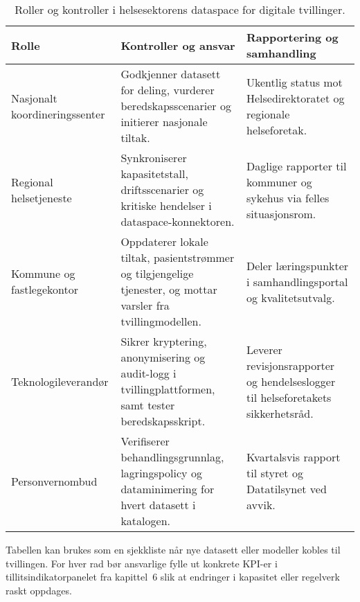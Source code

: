 \begin{table}[ht]
    \centering
    \caption{Roller og kontroller i helsesektorens dataspace for digitale tvillinger.}
    \label{tab:kap03-helse-dataspace}
    \begin{tabular}{p{}p{}p{}}
        \toprule
        \textbf{Rolle} & \textbf{Kontroller og ansvar} & \textbf{Rapportering og samhandling} \\
        \midrule
        Nasjonalt koordineringssenter & Godkjenner datasett for deling, vurderer beredskapsscenarier og initierer nasjonale tiltak. & Ukentlig status mot Helsedirektoratet og regionale helseforetak. \\
        Regional helsetjeneste & Synkroniserer kapasitetstall, driftsscenarier og kritiske hendelser i dataspace-konnektoren. & Daglige rapporter til kommuner og sykehus via felles situasjonsrom. \\
        Kommune og fastlegekontor & Oppdaterer lokale tiltak, pasientstrømmer og tilgjengelige tjenester, og mottar varsler fra tvillingmodellen. & Deler læringspunkter i samhandlingsportal og kvalitetsutvalg. \\
        Teknologileverandør & Sikrer kryptering, anonymisering og audit-logg i tvillingplattformen, samt tester beredskapsskript. & Leverer revisjonsrapporter og hendelseslogger til helseforetakets sikkerhetsråd. \\
        Personvernombud & Verifiserer behandlingsgrunnlag, lagringspolicy og dataminimering for hvert datasett i katalogen. & Kvartalsvis rapport til styret og Datatilsynet ved avvik. \\
        \bottomrule
    \end{tabular}
\end{table}

Tabellen kan brukes som en sjekkliste når nye datasett eller modeller kobles til tvillingen. For hver rad bør ansvarlige fylle ut
konkrete KPI-er i tillitsindikatorpanelet fra kapittel~6 slik at endringer i kapasitet eller regelverk raskt oppdages.

